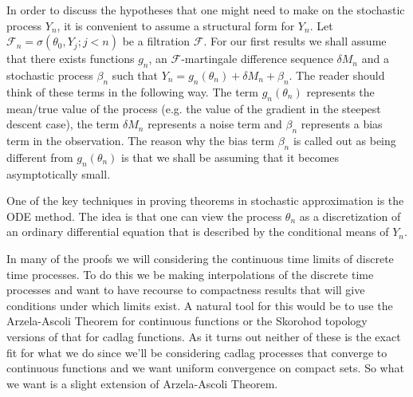 In order to discuss the hypotheses that one might need to make on the stochastic process $Y_n$, it is convenient to assume a structural form for $Y_n$.  Let $\mathcal{F}_n = \sigma(\theta_0, Y_j ; j<n)$ be a filtration $\mathcal{F}$.  For our first results we shall assume that there exists functions $g_n$, an $\mathcal{F}$-martingale difference sequence $\delta M_n$ and a stochastic process $\beta_n$ such that $Y_n = g_n(\theta_n) + \delta M_n + \beta_n$.  The reader should think of these terms in the following way.  The term $g_n(\theta_n)$ represents the mean/true value of the process (e.g. the value of the gradient in the steepest descent case), the term $\delta M_n$ represents a noise term and $\beta_n$ represents a bias term in the observation.  The reason why the bias term $\beta_n$ is called out as being different from $g_n(\theta_n)$ is that we shall be assuming that it becomes asymptotically small.

One of the key techniques in proving theorems in stochastic approximation is the ODE method.  The idea is that one can view the process $\theta_n$ as a discretization of an ordinary differential equation that is described by the conditional means of $Y_n$.  

In many of the proofs we will considering the continuous time limits of discrete time processes.  To do this we be making interpolations of the discrete time processes and want to have recourse to compactness results that will give conditions under which limits exist.  A natural tool for this would be to use the Arzela-Ascoli Theorem for continuous functions or the Skorohod topology versions of that for cadlag functions.  As it turns out neither of these is the exact fit for what we do since we'll be considering cadlag processes that converge to continuous functions and we want uniform convergence on compact sets.  So what we want is a slight extension of Arzela-Ascoli Theorem.

